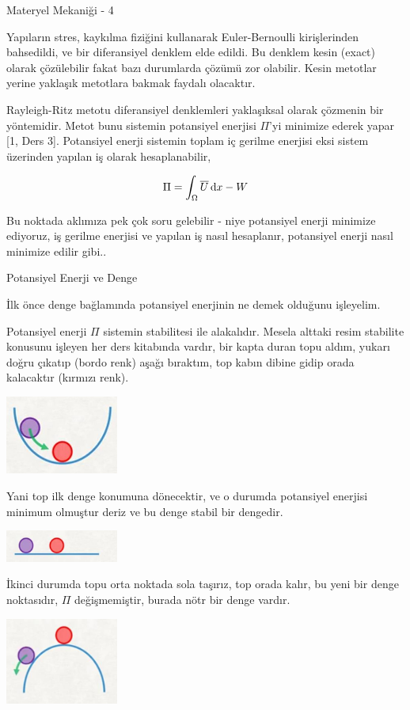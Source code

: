 \documentclass[12pt,fleqn]{article}\usepackage{../../common}
\begin{document}
Materyel Mekaniği - 4

Yapıların stres, kaykılma fiziğini kullanarak Euler-Bernoulli kirişlerinden
bahsedildi, ve bir diferansiyel denklem elde edildi. Bu denklem kesin (exact)
olarak çözülebilir fakat bazı durumlarda çözümü zor olabilir. Kesin metotlar
yerine yaklaşık metotlara bakmak faydalı olacaktır.

Rayleigh-Ritz metotu diferansiyel denklemleri yaklaşıksal olarak çözmenin bir
yöntemidir. Metot bunu sistemin potansiyel enerjisi $\Pi$'yi minimize ederek
yapar [1, Ders 3]. Potansiyel enerji sistemin toplam iç gerilme enerjisi eksi
sistem üzerinden yapılan iş olarak hesaplanabilir,

$$
\Pi = \int_\Omega \overline{U} \,\mathrm{d} x - W
$$

Bu noktada aklımıza pek çok soru gelebilir - niye potansiyel enerji minimize
ediyoruz, iş gerilme enerjisi ve yapılan iş nasıl hesaplanır, potansiyel enerji
nasıl minimize edilir gibi..

Potansiyel Enerji ve Denge

İlk önce denge bağlamında potansiyel enerjinin ne demek olduğunu işleyelim.

Potansiyel enerji $\Pi$ sistemin stabilitesi ile alakalıdır. Mesela alttaki
resim stabilite konusunu işleyen her ders kitabında vardır, bir kapta duran topu
aldım, yukarı doğru çıkatıp (bordo renk) aşağı bıraktım, top kabın dibine gidip
orada kalacaktır (kırmızı renk). 

\includegraphics[width=10em]{phy_020_strs_04_01.jpg}

Yani top ilk denge konumuna dönecektir, ve o durumda potansiyel enerjisi minimum
olmuştur deriz ve bu denge stabil bir dengedir.

\includegraphics[width=10em]{phy_020_strs_04_02.jpg}

İkinci durumda topu orta noktada sola taşırız, top orada kalır, bu yeni
bir denge noktasıdır, $\Pi$ değişmemiştir, burada nötr bir denge vardır.

\includegraphics[width=10em]{phy_020_strs_04_03.jpg}
\end{document}
